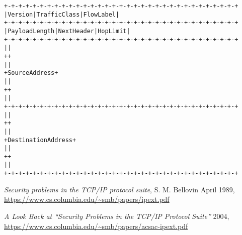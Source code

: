 \documentclass[Screen16to9,17pt]{foils}
\begin{document}
\begin{alltt}\footnotesize
   +-+-+-+-+-+-+-+-+-+-+-+-+-+-+-+-+-+-+-+-+-+-+-+-+-+-+-+-+-+-+-+-+
   |Version| Traffic Class |           Flow Label                  |
   +-+-+-+-+-+-+-+-+-+-+-+-+-+-+-+-+-+-+-+-+-+-+-+-+-+-+-+-+-+-+-+-+
   |         Payload Length        |  Next Header  |   Hop Limit   |
   +-+-+-+-+-+-+-+-+-+-+-+-+-+-+-+-+-+-+-+-+-+-+-+-+-+-+-+-+-+-+-+-+
   |                                                               |
   +                                                               +
   |                                                               |
   +                         Source Address                        +
   |                                                               |
   +                                                               +
   |                                                               |
   +-+-+-+-+-+-+-+-+-+-+-+-+-+-+-+-+-+-+-+-+-+-+-+-+-+-+-+-+-+-+-+-+
   |                                                               |
   +                                                               +
   |                                                               |
   +                      Destination Address                      +
   |                                                               |
   +                                                               +
   |                                                               |
   +-+-+-+-+-+-+-+-+-+-+-+-+-+-+-+-+-+-+-+-+-+-+-+-+-+-+-+-+-+-+-+-+
\end{alltt}






\begin{quote}

\end{quote}

\begin{list2}
\item
\emph{Security problems in the TCP/IP protocol suite}, S. M. Bellovin April 1989,\\
 \url{https://www.cs.columbia.edu/~smb/papers/ipext.pdf}
\item \emph{A Look Back at “Security Problems in the TCP/IP Protocol Suite”} 2004,\\
 \url{https://www.cs.columbia.edu/~smb/papers/acsac-ipext.pdf}
\end{list2}
\end{document}
